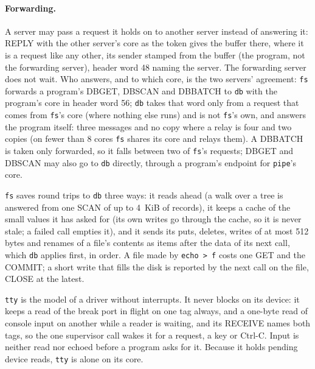 \paragraph{Forwarding.} A server may pass a request it holds on to another server instead of
answering it: REPLY with the other server's core as the token gives the buffer there, where it is a
request like any other, its sender stamped from the buffer (the program, not the forwarding server),
header word 48 naming the server. The forwarding server does not wait. Who answers, and to which
core, is the two servers' agreement: \texttt{fs} forwards a program's DBGET, DBSCAN and DBBATCH to
\texttt{db} with the program's core in header word 56; \texttt{db} takes that word only from a
request that comes from \texttt{fs}'s core (where nothing else runs) and is not \texttt{fs}'s own,
and answers the program itself: three messages and no copy where a relay is four and two copies (on
fewer than 8 cores \texttt{fs} shares its core and relays them). A
DBBATCH is taken only forwarded, so it falls between two of \texttt{fs}'s requests; DBGET and DBSCAN
may also go to \texttt{db} directly, through a program's endpoint for \texttt{pipe}'s core.

\texttt{fs} saves round trips to \texttt{db} three ways: it reads ahead (a walk over a tree is
answered from one SCAN of up to 4~KiB of records), it keeps a cache of the small values it has asked
for (its own writes go through the cache, so it is never stale; a failed call empties it), and it
sends its puts, deletes, writes of at most 512 bytes and renames of a file's contents as items after
the data of its next call, which \texttt{db} applies first, in order. A file made by
\texttt{echo > f} costs one GET and the COMMIT; a short write that fills the disk is reported by the
next call on the file, CLOSE at the latest.







\texttt{tty} is the model of a driver without interrupts. It never blocks on its device: it keeps a
read of the break port in flight on one tag always, and a one-byte read of console input on another
while a reader is waiting, and its RECEIVE names both tags, so the one supervisor call wakes it for a
request, a key or Ctrl-C. Input is neither read nor echoed before a program asks for it. Because it
holds pending device reads, \texttt{tty} is alone on its core.

